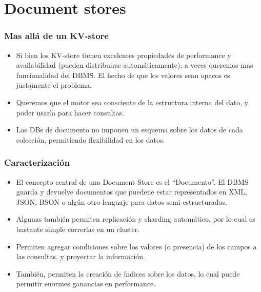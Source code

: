 \section{Document stores}

\begin{frame}
\frametitle{Mas allá de un KV-store}
\begin{itemize}

\item	Si bien los KV-store tienen excelentes propiedades de performance
	y availabilidad (pueden distribuirse automáticamente), a veces
	queremos mas funcionalidad del DBMS. El hecho de que los valores
	sean opacos es justamente el problema.
	\pause

\item	Queremos que el motor sea consciente de la estructura interna
	del dato, y poder usarla para hacer consultas.
	\pause

\item	Las DBs de documento no imponen un esquema sobre los datos de
	cada colección, permitiendo flexibilidad en los datos.
\end{itemize}
\end{frame}

\begin{frame}
\frametitle{Caracterización}
\begin{itemize}
\item	El concepto central de una Document Store es el ``Documento''.
	El DBMS guarda y devuelve documentos que puedene estar representados
	en XML, JSON, BSON o algún otro lenguaje para datos semi-estructurados.
	\pause

\item	Algunas también permiten replicación y sharding automático, por lo
	cual es bastante simple correrlas en un cluster.
	\pause

\item	Permiten agregar condiciones sobre los valores (o presencia) de los
	campos a las consultas, y proyectar la información.
	\pause

\item	También, permiten la creación de índices sobre los datos, lo cual
	puede permitir enormes ganancias en performance.
\end{itemize}
\end{frame}
